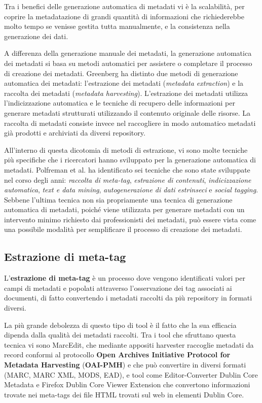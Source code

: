 Tra i benefici delle generazione automatica di metadati vi è la scalabilità, per coprire la metadatazione di grandi quantità di informazioni che richiederebbe molto tempo se venisse gestita tutta manualmente, e la consistenza nella generazione dei dati.

A differenza della generazione manuale dei metadati, la generazione automatica dei metadati si basa su metodi automatici per assistere o completare il processo di creazione dei metadati. Greenberg ha distinto due metodi di generazione automatica dei metadati: l'estrazione dei metadati (\textit{metadata extraction}) e la raccolta dei metadati (\textit{metadata harvesting}).
L'estrazione dei metadati utilizza l'indicizzazione automatica e le tecniche di recupero delle informazioni per generare metadati strutturati utilizzando il contenuto originale delle risorse. La raccolta di metadati consiste invece nel raccogliere in modo automatico metadati già prodotti e archiviati da diversi repository.

\vspace{5mm}

All'interno di questa dicotomia di metodi di estrazione, vi sono molte tecniche più specifiche che i ricercatori hanno sviluppato per la generazione automatica di metadati. Polfreman et al. ha identificato sei tecniche che sono state sviluppate nel corso degli anni: \textit{raccolta di meta-tag}, \textit{estrazione di contenuti}, \textit{indicizzazione automatica}, \textit{text e data mining}, \textit{autogenerazione di dati estrinseci} e \textit{social tagging}. Sebbene l'ultima tecnica non sia propriamente una tecnica di generazione automatica di metadati, poiché viene utilizzata per generare metadati con un intervento minimo richiesto dai professionisti dei metadati, può essere vista come una possibile modalità per semplificare il processo di creazione dei metadati\cite{semi}.

\subsection{Estrazione di meta-tag}
L'\textbf{estrazione di meta-tag} è un processo dove vengono identificati valori per campi di metadati e popolati attraverso l'osservazione dei tag associati ai documenti, di fatto convertendo i metadati raccolti da più repository in formati diversi.

La più grande debolezza di questo tipo di tool è il fatto che la sua efficacia dipenda dalla qualità dei metadati raccolti.
Tra i tool che sfruttano questa tecnica vi sono MarcEdit, che mediante appositi harvester raccoglie metadati da record conformi al protocollo \textbf{Open Archives Initiative Protocol for Metadata Harvesting} (\textbf{OAI-PMH}) e che può convertire in diversi formati (MARC, MARC XML, MODS, EAD), e tool come Editor-Converter Dublin Core Metadata e Firefox Dublin Core Viewer Extension che convertono informazioni trovate nei meta-tags dei file HTML trovati sul web in elementi Dublin Core.

